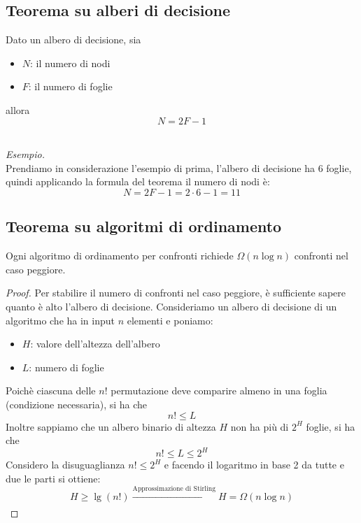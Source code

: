 \subsection{Teorema su alberi di decisione}
\colorbox{SALZO}{\parbox{\dimexpr\linewidth-2\fboxsep}{\begin{theorem}
   Dato un albero di decisione, sia
   \begin{itemize}
       \item $N$: il numero di nodi 
       \item $F$: il numero di foglie
   \end{itemize}
   allora
   $$N = 2F-1$$
\end{theorem}}}\smallskip\\
\textit{Esempio.}\\
Prendiamo in considerazione l'esempio di prima, l'albero di decisione ha 6 foglie, quindi applicando la formula del teorema il numero di nodi è:
$$N = 2F-1 = 2\cdot 6 -1 = \boxed{11}$$

\subsection{Teorema su algoritmi di ordinamento}
\colorbox{SALZO}{\parbox{\dimexpr\linewidth-2\fboxsep}{\begin{theorem}
    Ogni algoritmo di ordinamento per confronti richiede $\Omega (n\log n)$ confronti nel caso peggiore.
\end{theorem}}}
\begin{proof}
    Per stabilire il numero di confronti nel caso peggiore, è sufficiente sapere quanto è alto l'albero di decisione. Consideriamo un albero di decisione di un algoritmo che ha in input $n$ elementi e poniamo:
    \begin{itemize}[label=--]
        \item $H$: valore dell'altezza dell'albero
        \item $L$: numero di foglie 
    \end{itemize}
    Poichè ciascuna delle $n!$ permutazione deve comparire almeno in una foglia (condizione necessaria), si ha che 
    $$n!\le L$$
    Inoltre sappiamo che un albero binario di altezza $H$ non ha più di $2^H$ foglie, si ha che 
    $$n!\le L \le 2^H$$
    Considero la disuguaglianza $n!\le 2^H$ e facendo il logaritmo in base 2 da tutte e due le parti si ottiene:
    $$H \ge \lg (n!) \xrightarrow[]{\text{Approssimazione di Stirling}} \boxed{H = \Omega(n \log n)}$$
\end{proof}


